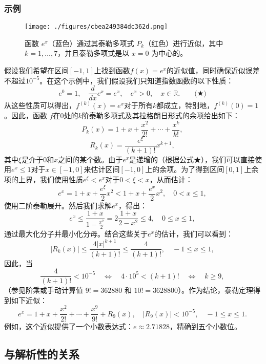 \subsubsection{示例}
\begin{figure}[ht]
\centering
\texttt{[image: ./figures/cbea249384dc362d.png]}
\caption{函数 \( e^x \)（蓝色）通过其泰勒多项式 \( P_k \)（红色）进行近似，其中 \( k = 1, \ldots, 7 \)，并且泰勒多项式是以 \( x = 0 \) 为中心的。} \label{fig_TLGS_5}
\end{figure}
假设我们希望在区间\( [-1, 1] \)上找到函数\( f(x) = e^x \)的近似值，同时确保近似误差不超过\( 10^{-5} \)。在这个示例中，我们假设我们只知道指数函数的以下性质：
\[
e^0 = 1, \quad \frac{d}{dx} e^x = e^x, \quad e^x > 0, \quad x \in \mathbb{R}.\qquad \text{(★)}~
\]
从这些性质可以得出，\( f^{(k)}(x) = e^x \)对于所有\( k \)都成立，特别地，\( f^{(k)}(0) = 1 \)。因此，函数 \( f \)在\( 0 \)处的\( k \)阶泰勒多项式及其拉格朗日形式的余项给出如下：
\[
P_k(x) = 1 + x + \frac{x^2}{2!} + \cdots + \frac{x^k}{k!},~
\]
\[
R_k(x) = \frac{e^\xi}{(k+1)!} x^{k+1},~
\]
其中\( \xi \)是介于\( 0 \)和\( x \)之间的某个数。由于\( e^x \)是递增的（根据公式★），我们可以直接使用\( e^x \leq 1 \)对于\( x \in [-1, 0] \)来估计区间\( [-1, 0] \)上的余项。为了得到区间\( [0, 1] \)上余项的上界，我们使用性质\( e^\xi < e^x \)对于\( 0 < \xi < x \)，从而估计：
\[
e^x = 1 + x + \frac{e^\xi}{2} x^2 < 1 + x + \frac{e^x}{2} x^2, \quad 0 < x \leq 1,~
\]
使用二阶泰勒展开。然后我们求解\( e^x \)，得出：
\[
e^x \leq \frac{1 + x}{1 - \frac{x^2}{2}} = 2 \frac{1 + x}{2 - x^2} \leq 4, \quad 0 \leq x \leq 1,~
\]
通过最大化分子并最小化分母。结合这些关于\( e^x \)的估计，我们可以看到：
\[
|R_k(x)| \leq \frac{4 |x|^{k+1}}{(k+1)!} \leq \frac{4}{(k+1)!}, \quad -1 \leq x \leq 1,~
\]
因此，当
\[
\frac{4}{(k+1)!} < 10^{-5} \quad \Longleftrightarrow \quad 4 \cdot 10^5 < (k+1)! \quad \Longleftrightarrow \quad k \geq 9,~
\]
（参见阶乘或手动计算值 \( 9! = 362880 \) 和 \( 10! = 3628800 \)）。作为结论，泰勒定理得到如下近似：
\[
e^x = 1 + x + \frac{x^2}{2!} + \cdots + \frac{x^9}{9!} + R_9(x), \quad |R_9(x)| < 10^{-5}, \quad -1 \leq x \leq 1.~
\]
例如，这个近似提供了一个小数表达式：\(e \approx 2.71828\)，精确到五个小数位。
\subsection{与解析性的关系}  
